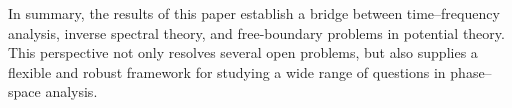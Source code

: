 \medskip

In summary, the results of this paper establish a bridge between time--frequency analysis, inverse spectral theory, and free-boundary problems in potential theory. This perspective not only resolves several open problems, but also supplies a flexible and robust framework for studying a wide range of questions in phase--space analysis.

